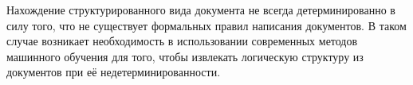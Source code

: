 Нахождение структурированного вида документа не всегда детерминированно в силу того, что не существует формальных правил написания документов.
В таком случае возникает необходимость в использовании современных методов машинного обучения для того,
чтобы извлекать логическую структуру из документов при её недетерминированности.